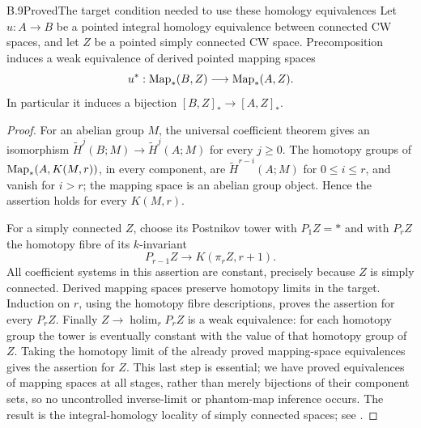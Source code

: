 \begin{claim}{B.9}{Proved}{The target condition needed to use these homology equivalences}
Let $u:A\to B$ be a pointed integral homology equivalence between
connected CW spaces, and let $Z$ be a pointed simply connected CW space.
Precomposition induces a weak equivalence of derived pointed mapping
spaces
\[
 u^*:\operatorname{Map}_*(B,Z)\longrightarrow\operatorname{Map}_*(A,Z).
\]
In particular it induces a bijection $[B,Z]_*\to[A,Z]_*$.
\end{claim}
\begin{proof}
For an abelian group $M$, the universal coefficient theorem gives an
isomorphism $\widetilde H^j(B;M)\to\widetilde H^j(A;M)$ for every
$j\geq0$.  The homotopy groups of
$\operatorname{Map}_*(A,K(M,r))$, in every component, are
$\widetilde H^{r-i}(A;M)$ for $0\leq i\leq r$, and vanish for $i>r$;
the mapping space is an abelian group object.  Hence the assertion holds
for every $K(M,r)$.

For a simply connected $Z$, choose its Postnikov tower with
$P_1Z=*$ and with $P_rZ$ the homotopy fibre of its $k$-invariant
\[
 P_{r-1}Z\longrightarrow K(\pi_rZ,r+1).
\]
All coefficient systems in this assertion are constant, precisely
because $Z$ is simply connected.  Derived mapping spaces preserve
homotopy limits in the target.  Induction on $r$, using the homotopy
fibre descriptions, proves the assertion for every $P_rZ$.  Finally
$Z\to\operatorname{holim}_rP_rZ$ is a weak equivalence: for each
homotopy group the tower is eventually constant with the value of that
homotopy group of $Z$.  Taking the homotopy limit of the already proved
mapping-space equivalences gives the assertion for $Z$.  This last step
is essential; we have proved equivalences of mapping spaces at all
stages, rather than merely bijections of their component sets, so no
uncontrolled inverse-limit or phantom-map inference occurs.  The result
is the integral-homology locality of simply connected spaces; see
\citet[Example~9.2]{BC_Lawson2019}.
\end{proof}

